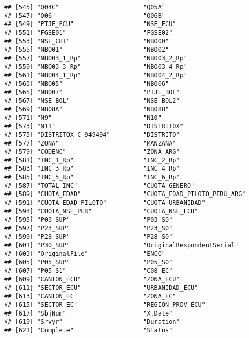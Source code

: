 \documentclass[
]{article}
\begin{document}
\begin{verbatim}
## [545] "Q04C"                       "Q05A"                      
## [547] "Q06"                        "Q06B"                      
## [549] "PTJE_ECU"                   "NSE_ECU"                   
## [551] "FGSE01"                     "FGSE02"                    
## [553] "NSE_CHI"                    "NBO00"                     
## [555] "NBO01"                      "NBO02"                     
## [557] "NBO03_1_Rp"                 "NBO03_2_Rp"                
## [559] "NBO03_3_Rp"                 "NBO03_4_Rp"                
## [561] "NBO04_1_Rp"                 "NBO04_2_Rp"                
## [563] "NBO05"                      "NBO06"                     
## [565] "NBO07"                      "PTJE_BOL"                  
## [567] "NSE_BOL"                    "NSE_BOL2"                  
## [569] "NB08A"                      "NB08B"                     
## [571] "N9"                         "N10"                       
## [573] "N11"                        "DISTRITOX"                 
## [575] "DISTRITOX_C_949494"         "DISTRITO"                  
## [577] "ZONA"                       "MANZANA"                   
## [579] "CODENC"                     "ZONA_ARG"                  
## [581] "INC_1_Rp"                   "INC_2_Rp"                  
## [583] "INC_3_Rp"                   "INC_4_Rp"                  
## [585] "INC_5_Rp"                   "INC_6_Rp"                  
## [587] "TOTAL_INC"                  "CUOTA_GENERO"              
## [589] "CUOTA_EDAD"                 "CUOTA_EDAD_PILOTO_PERU_ARG"
## [591] "CUOTA_EDAD_PILOTO"          "CUOTA_URBANIDAD"           
## [593] "CUOTA_NSE_PER"              "CUOTA_NSE_ECU"             
## [595] "P03_SUP"                    "P03_S0"                    
## [597] "P23_SUP"                    "P23_S0"                    
## [599] "P28_SUP"                    "P28_S0"                    
## [601] "P30_SUP"                    "OriginalRespondentSerial"  
## [603] "OriginalFile"               "ENCO"                      
## [605] "P05_SUP"                    "P05_S0"                    
## [607] "P05_S1"                     "C08_EC"                    
## [609] "CANTON_ECU"                 "ZONA_ECU"                  
## [611] "SECTOR_ECU"                 "URBANIDAD_ECU"             
## [613] "CANTON_EC"                  "ZONA_EC"                   
## [615] "SECTOR_EC"                  "REGION_PROV_ECU"           
## [617] "SbjNum"                     "X.Date"                    
## [619] "Srvyr"                      "Duration"                  
## [621] "Complete"                   "Status"                    

\end{verbatim}
\end{document}
